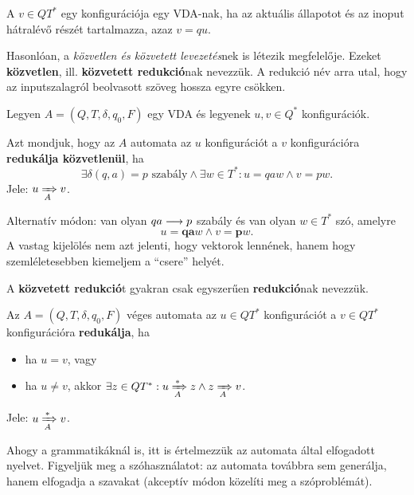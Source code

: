 \begin{tcolorbox}
	\begin{definition}[Konfiguráció]
		A $v \in QT^*$ egy konfigurációja egy VDA-nak, ha az aktuális állapotot és az inoput hátralévő részét tartalmazza, azaz $v = qu$.
	\end{definition}
\end{tcolorbox}

Hasonlóan, a \textit{közvetlen és közvetett levezetés}nek is létezik megfelelője. Ezeket \textbf{közvetlen}, ill. \textbf{közvetett redukció}nak nevezzük. A redukció név arra utal, hogy az inputszalagról beolvasott szöveg hossza egyre csökken.

\begin{tcolorbox}
	\begin{definition}
		Legyen $A = (Q,T,\delta,q_0,F)$ egy VDA és legyenek $u,v \in Q^*$ konfigurációk.
		
		Azt mondjuk, hogy az $A$ automata az $u$ konfigurációt a $v$ konfigurációra \textbf{redukálja közvetlenül}, ha
		\[ \exists \delta(q,a)=p \text{ szabály} \land \exists w \in T^* : u = qaw \land v = pw. \]
		Jele: $u\xRightarrow[{A}]{}v$.
	\end{definition}
\end{tcolorbox}

Alternatív módon: van olyan $qa \longrightarrow p$ szabály és van olyan $w \in T^*$ szó, amelyre \[u=\textbf{qa}w \land v = \textbf{p}w.\] A vastag kijelölés nem azt jelenti, hogy vektorok lennének, hanem hogy szemléletesebben kiemeljem a ``csere'' helyét.

A \textbf{közvetett redukció}t gyakran csak egyszerűen \textbf{redukció}nak nevezzük.

\begin{tcolorbox}
	\begin{definition}
		Az $A = (Q,T,\delta,q_0,F)$ véges automata az $u \in QT^*$ konfigurációt a $v \in QT^*$ konfigurációra \textbf{redukálja}, ha
		\begin{itemize}
			\item ha $u = v$, vagy
			\item ha $u \neq v$, akkor $\exists z \in QT^* : u \xRightarrow[{A}]{*} z \land z \xRightarrow[{A}]{} v$.
		\end{itemize}
		Jele: $u\xRightarrow[{A}]{*}v$.
	\end{definition}
\end{tcolorbox}

Ahogy a grammatikáknál is, itt is értelmezzük az automata által elfogadott nyelvet. Figyeljük meg a szóhasználatot: az automata továbbra sem generálja, hanem elfogadja a szavakat (akceptív módon közelíti meg a szóproblémát).

